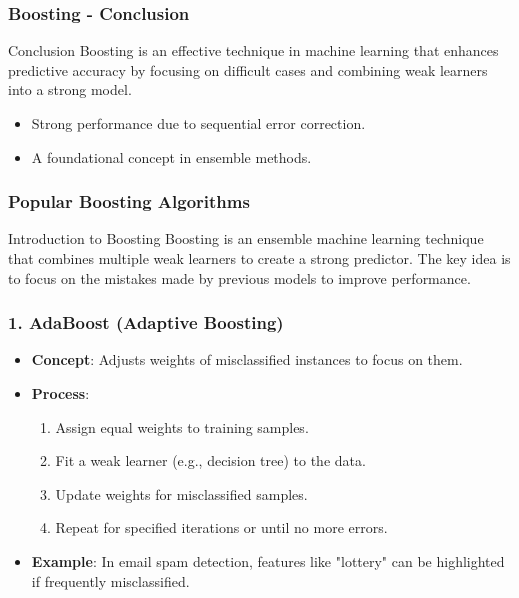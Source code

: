 \documentclass[aspectratio=169]{beamer}
\begin{document}
\begin{frame}[fragile]
    \frametitle{Boosting - Conclusion}
    
    \begin{block}{Conclusion}
        Boosting is an effective technique in machine learning that enhances predictive accuracy by focusing on difficult cases and combining weak learners into a strong model. 
    \end{block}
    
    \begin{itemize}
        \item Strong performance due to sequential error correction.
        \item A foundational concept in ensemble methods.
    \end{itemize}
\end{frame}

\begin{frame}[fragile]
    \frametitle{Popular Boosting Algorithms}
    \begin{block}{Introduction to Boosting}
        Boosting is an ensemble machine learning technique that combines multiple weak learners to create a strong predictor. The key idea is to focus on the mistakes made by previous models to improve performance.
    \end{block}
\end{frame}

\begin{frame}[fragile]
    \frametitle{1. AdaBoost (Adaptive Boosting)}
    \begin{itemize}
        \item \textbf{Concept}: Adjusts weights of misclassified instances to focus on them.
        \item \textbf{Process}:
        \begin{enumerate}
            \item Assign equal weights to training samples.
            \item Fit a weak learner (e.g., decision tree) to the data.
            \item Update weights for misclassified samples.
            \item Repeat for specified iterations or until no more errors.
        \end{enumerate}
        \item \textbf{Example}: In email spam detection, features like "lottery" can be highlighted if frequently misclassified.
    \end{itemize}
\end{frame}
\end{document}
